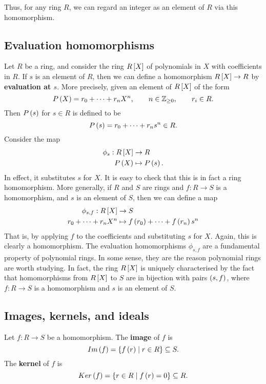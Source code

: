 Thus, for any ring $ R $, we can regard an integer as an element of $ R $ via this homomorphism.

\subsection{Evaluation homomorphisms}

Let $ R $ be a ring, and consider the ring $ R\sb{X} $ of polynomials in $ X $ with coefficients in $ R $. If $ s $ is an element of $ R $, then we can define a homomorphism $ R\sb{X} \to R $ by \textbf{evaluation at $ s $}. More precisely, given an element of $ R\sb{X} $ of the form
$$ P\rb{X} = r_0 + \dots + r_nX^n, \qquad n \in \Z_{\ge 0}, \qquad r_i \in R. $$
Then $ P\rb{s} $ for $ s \in R $ is defined to be
$$ P\rb{s} = r_0 + \dots + r_ns^n \in R. $$
Consider the map
\begin{align*}
\phi_s : R\sb{X} & \to R \\
P\rb{X} & \mapsto P\rb{s}.
\end{align*}
In effect, it substitutes $ s $ for $ X $. It is easy to check that this is in fact a ring homomorphism. More generally, if $ R $ and $ S $ are rings and $ f : R \to S $ is a homomorphism, and $ s $ is an element of $ S $, then we can define a map
\begin{align*}
\phi_{s, f} : R\sb{X} & \to S \\
r_0 + \dots + r_nX^n & \mapsto f\rb{r_0} + \dots + f\rb{r_n}s^n
\end{align*}
That is, by applying $ f $ to the coefficients and substituting $ s $ for $ X $. Again, this is clearly a homomorphism. The evaluation homomorphisms $ \phi_{s, f} $ are a fundamental property of polynomial rings. In some sense, they are the reason polynomial rings are worth studying. In fact, the ring $ R\sb{X} $ is uniquely characterised by the fact that homomorphisms from $ R\sb{X} $ to $ S $ are in bijection with pairs $ \rb{s, f} $, where $ f : R \to S $ is a homomorphism and $ s $ is an element of $ S $.

\subsection{Images, kernels, and ideals}

\begin{definition}
Let $ f : R \to S $ be a homomorphism. The \textbf{image} of $ f $ is
$$ Im\rb{f} = \cb{f\rb{r} \mid r \in R} \subseteq S. $$
The \textbf{kernel} of $ f $ is
$$ Ker\rb{f} = \cb{r \in R \mid f\rb{r} = 0} \subseteq R. $$
\end{definition}

